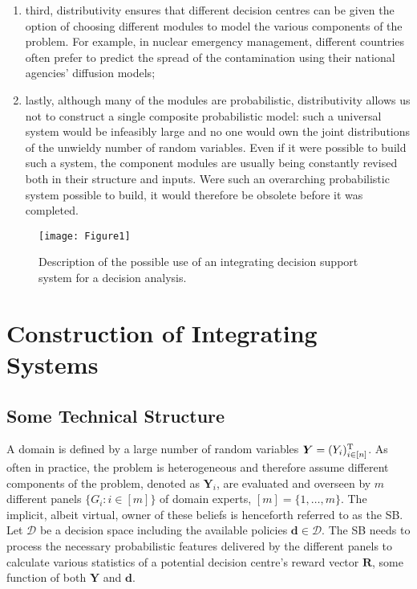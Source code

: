 \begin{enumerate}
\item third, distributivity ensures that different decision centres can be given the option of choosing different modules to model the various components of the problem. For example, in nuclear emergency management, different countries often prefer to predict the spread of the contamination using  their national agencies' diffusion models;
\item lastly, although many of the modules are probabilistic, distributivity allows us not to construct a single composite probabilistic model: such a universal system would be infeasibly large and no one would own the joint distributions of the unwieldy number of random variables. Even if it were possible to build such a system, the component modules are usually being constantly revised both in their structure and inputs. Were such an overarching probabilistic system possible to build, it would therefore be obsolete before it was completed.  
\end{enumerate}

\begin{figure}
\begin{center}
\texttt{[image: Figure1]}
\caption{Description of the possible use of an integrating decision support system for a decision analysis. \label{possuse}}
\end{center}
\end{figure}


\section{Construction of Integrating Systems}
\label{sec:construction}
\subsection{Some Technical Structure}
A domain is defined by a large number of random variables $\bm{Y}=(Y_i)_{i\in[n]}^{\textnormal{T}}$. As often in practice, the problem is heterogeneous and therefore assume different components of the problem, denoted as $\bm{Y}_i$, are evaluated and overseen by $m$ different panels $\{G_i: i\in[m]\}$ of domain experts, $[m]=\{1,\dots, m\}$. The implicit, albeit virtual, owner of these beliefs is henceforth referred to as the SB. Let $\bm{\mathcal{D}}$ be a decision space including the available policies $\bm{d}\in\bm{\mathcal{D}}$.  The SB needs to process the necessary probabilistic features delivered by the different panels to calculate various statistics of a potential decision centre's reward vector $\bm{R}$, some function of both $\bm{Y}$ and $\bm{d}$. 

